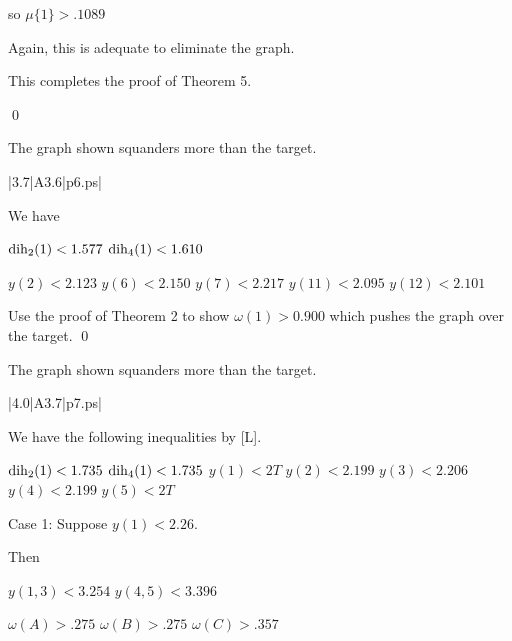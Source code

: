 so $\mu\{1\}>.1089$

Again, this is adequate to eliminate the graph.

This completes the proof of Theorem 5.

\qed

\bigskip



 The graph shown 
squanders more than the target.  \endproclaim

\gram|3.7|A3.6|p6.ps|  %

We have 

$\operatorname{dih}_2(1) < 1.577$ \newline
$\operatorname{dih}_4(1) < 1.610$ \newline

$y(2)<2.123$ \newline
$y(6)<2.150$ \newline
$y(7)<2.217$ \newline
$y(11)<2.095$ \newline
$y(12)<2.101$ \newline

Use the proof of Theorem 2 to show $\omega(1)>0.900$ which pushes the graph over the target. \qed

\bigskip

 The graph shown 
squanders more than the target.  \endproclaim

\gram|4.0|A3.7|p7.ps|  %


We have the following inequalities by [L].

$\operatorname{dih}_2(1) < 1.735$ \newline
$\operatorname{dih}_4(1) < 1.735$ \newline
$y(1)<2T$ \newline
$y(2)<2.199$ \newline
$y(3)<2.206$ \newline
$y(4)<2.199$ \newline
$y(5)<2T$ \newline


Case 1: Suppose $y(1)<2.26$.

Then 

$y(1,3)<3.254$ \newline
$y(4,5)<3.396$ \newline

$\omega(A)>.275$ \newline
$\omega(B)>.275$ \newline
$\omega(C)>.357$ \newline

